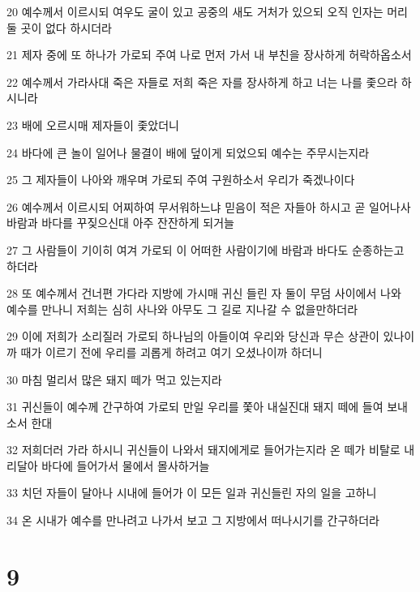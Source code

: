 \par 20 예수께서 이르시되 여우도 굴이 있고 공중의 새도 거처가 있으되 오직 인자는 머리 둘 곳이 없다 하시더라
\par 21 제자 중에 또 하나가 가로되 주여 나로 먼저 가서 내 부친을 장사하게 허락하옵소서
\par 22 예수께서 가라사대 죽은 자들로 저희 죽은 자를 장사하게 하고 너는 나를 좇으라 하시니라
\par 23 배에 오르시매 제자들이 좇았더니
\par 24 바다에 큰 놀이 일어나 물결이 배에 덮이게 되었으되 예수는 주무시는지라
\par 25 그 제자들이 나아와 깨우며 가로되 주여 구원하소서 우리가 죽겠나이다
\par 26 예수께서 이르시되 어찌하여 무서워하느냐 믿음이 적은 자들아 하시고 곧 일어나사 바람과 바다를 꾸짖으신대 아주 잔잔하게 되거늘
\par 27 그 사람들이 기이히 여겨 가로되 이 어떠한 사람이기에 바람과 바다도 순종하는고 하더라
\par 28 또 예수께서 건너편 가다라 지방에 가시매 귀신 들린 자 둘이 무덤 사이에서 나와 예수를 만나니 저희는 심히 사나와 아무도 그 길로 지나갈 수 없을만하더라
\par 29 이에 저희가 소리질러 가로되 하나님의 아들이여 우리와 당신과 무슨 상관이 있나이까 때가 이르기 전에 우리를 괴롭게 하려고 여기 오셨나이까 하더니
\par 30 마침 멀리서 많은 돼지 떼가 먹고 있는지라
\par 31 귀신들이 예수께 간구하여 가로되 만일 우리를 쫓아 내실진대 돼지 떼에 들여 보내소서 한대
\par 32 저희더러 가라 하시니 귀신들이 나와서 돼지에게로 들어가는지라 온 떼가 비탈로 내리달아 바다에 들어가서 물에서 몰사하거늘
\par 33 치던 자들이 달아나 시내에 들어가 이 모든 일과 귀신들린 자의 일을 고하니
\par 34 온 시내가 예수를 만나려고 나가서 보고 그 지방에서 떠나시기를 간구하더라

\chapter{9}

